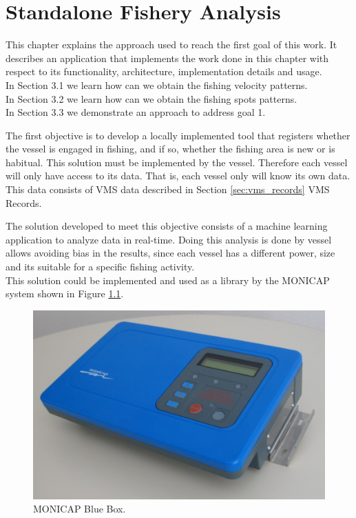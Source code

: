 % 
% 
%
\chapter{Standalone Fishery Analysis}
\label{cha:standalone_fishery_analysis}
This chapter explains the approach used to reach the first goal of this work. It describes an application that implements the work done in this chapter with respect to its functionality, architecture, implementation details and usage. \\
In Section 3.1 we learn how can we obtain the fishing velocity patterns.\\
In Section 3.2 we learn how can we obtain the fishing spots patterns. \\
In Section 3.3 we demonstrate an approach to address goal 1.

The first objective is to develop a locally implemented tool that registers whether the vessel is engaged in fishing, and if so, whether the fishing area is new or is habitual. This solution must be implemented by the vessel. Therefore each vessel will only have access to its data. That is, each vessel only will know its own data. This data consists of VMS data described in Section \ref{sec:vms_records} VMS Records.

The solution developed to meet this objective consists of a machine learning application to analyze data in real-time.
Doing this analysis is done by vessel allows avoiding bias in the results, since each vessel has a different power, size and its suitable for a specific fishing activity.\\
This solution could be implemented and used as a library by the MONICAP \cite{WEBSITE:MonicapXsealence} system shown in Figure \ref{fig:monicap}.

\begin{figure}[H]
\centering
\includegraphics[width=0.8\linewidth]{Chapters/img/equipamento_monicap.png}
\caption{MONICAP Blue Box.}
\label{fig:monicap}
\end{figure}


